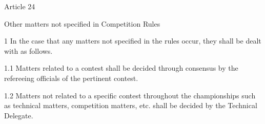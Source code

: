 \documentclass[
]{report}
\begin{document}
Article 24

Other matters not specified in Competition Rules

1 In the case that any matters not specified in the rules occur, they
shall be dealt with as follows.

1.1 Matters related to a contest shall be decided through consensus by
the refereeing officials of the pertinent contest.

1.2 Matters not related to a specific contest throughout the
championships such as technical matters, competition matters, etc. shall
be decided by the Technical Delegate.
\end{document}
